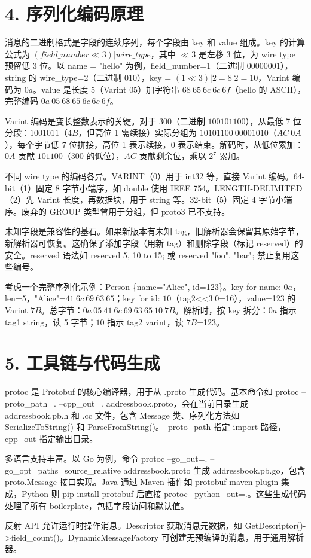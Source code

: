 \chapter{4. 序列化编码原理}
消息的二进制格式是字段的连续序列，每个字段由 key 和 value 组成。key 的计算公式为 $(field\_number \ll 3) | wire\_type$，其中 $\ll 3$ 是左移 3 位，为 wire type 预留低 3 位。以 name = "hello" 为例，field\_{}number=1（二进制 $00000001$），string 的 wire\_{}type=2（二进制 $010$），key = $(1 \ll 3) | 2 = 8 | 2 = 10$，Varint 编码为 $0a$。value 是长度 5（Varint $05$）加字符串 $68\ 65\ 6c\ 6c\ 6f$（hello 的 ASCII），完整编码 $0a\ 05\ 68\ 65\ 6c\ 6c\ 6f$。\par
Varint 编码是变长整数表示的关键。对于 300（二进制 $100101100$），从最低 7 位分段：$1001011$（$4B$，但高位 1 需续接）实际分组为 $10101100\ 00001010$（$AC\ 0A$），每个字节低 7 位拼接，高位 1 表示续接，0 表示结束。解码时，从低位累加：$0A$ 贡献 $101100$（300 的低位），$AC$ 贡献剩余位，乘以 $2^7$ 累加。\par
不同 wire type 的编码各异。VARINT（0）用于 int32 等，直接 Varint 编码。64-bit（1）固定 8 字节小端序，如 double 使用 IEEE 754。LENGTH-DELIMITED（2）先 Varint 长度，再数据块，用于 string 等。32-bit（5）固定 4 字节小端序。废弃的 GROUP 类型曾用于分组，但 proto3 已不支持。\par
未知字段是兼容性的基石。如果新版本有未知 tag，旧解析器会保留其原始字节，新解析器可恢复。这确保了添加字段（用新 tag）和删除字段（标记 reserved）的安全。reserved 语法如 reserved 5, 10 to 15; 或 reserved "foo", "bar"; 禁止复用这些编号。\par
考虑一个完整序列化示例：Person \{{}name="Alice", id=123\}{}。key for name: $0a$，len=5，"Alice"=$41\ 6c\ 69\ 63\ 65$；key for id: $10$（tag2<<3|0=16），value=123 的 Varint $7B$。总字节：$0a\ 05\ 41\ 6c\ 69\ 63\ 65\ 10\ 7B$。解析时，按 key 拆分：$0a$ 指示 tag1 string，读 5 字节；$10$ 指示 tag2 varint，读 $7B$=123。\par
\chapter{5. 工具链与代码生成}
protoc 是 Protobuf 的核心编译器，用于从 .proto 生成代码。基本命令如 protoc --proto\_{}path=. --cpp\_{}out=. addressbook.proto，会在当前目录生成 addressbook.pb.h 和 .cc 文件，包含 Message 类、序列化方法如 SerializeToString() 和 ParseFromString()。--proto\_{}path 指定 import 路径，--cpp\_{}out 指定输出目录。\par
多语言支持丰富。以 Go 为例，命令 protoc --go\_{}out=. --go\_{}opt=paths=source\_{}relative addressbook.proto 生成 addressbook.pb.go，包含 proto.Message 接口实现。Java 通过 Maven 插件如 protobuf-maven-plugin 集成，Python 则 pip install protobuf 后直接 protoc --python\_{}out=.。这些生成代码处理了所有 boilerplate，包括字段访问和默认值。\par
反射 API 允许运行时操作消息。Descriptor 获取消息元数据，如 GetDescriptor()->field\_{}count()。DynamicMessageFactory 可创建无预编译的消息，用于通用解析器。\par
